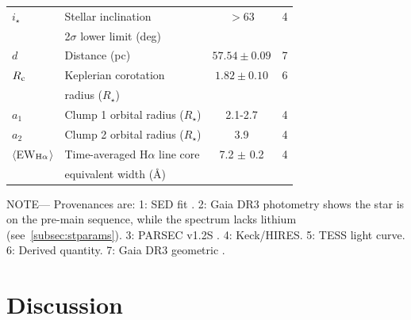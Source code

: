\documentclass{nature3}
\begin{document}
\begin{table}
\begin{tabular}{llcc}
%
$i_\star$\dotfill                       & Stellar inclination\dotfill                                    & 	$>$63           & 4 \\
                                        & \hspace{3pt}  2$\sigma$ lower limit (deg)	                     &                      \\
%
$d$\dotfill                             & Distance (pc)\dotfill                                          & $57.54 \pm 0.09$ & 7 \\
%
$R_{\rm c}$\dotfill		                  & Keplerian corotation\dotfill                                   & $1.82 \pm 0.10$  & 6 \\
                                        & \hspace{3pt} radius ($R_\star$)	                               &                      \\
%
$a_1$\dotfill                           & Clump 1 orbital radius ($R_\star$)\hspace{9pt}\dotfill         &  2.1-2.7         & 4 \\
$a_2$\dotfill                           & Clump 2 orbital radius ($R_\star$)\hspace{9pt}\dotfill         &  3.9             & 4 \\
%
$\langle$EW$_{\rm H\alpha}$$\rangle$    & Time-averaged H$\alpha$ line core                              &  7.2 $\pm$ 0.2   & 4 \\ 
                                        & \hspace{3pt} equivalent width (\AA)	                           &                      \\
\hline
\end{tabular}
\begin{flushleft}
\footnotesize{ \textsc{NOTE}---
Provenances are:
1: SED fit \cite{Bouma2024}.
2: Gaia DR3 photometry shows the star is on the pre-main sequence,
   while the spectrum lacks lithium (see~\ref{subsec:stparams}).
3: PARSEC v1.2S \cite{Chen2014}.
4: Keck/HIRES.
5: TESS light curve.
6: Derived quantity.
7: Gaia DR3 geometric \cite{GaiaDR3}.
}
\end{flushleft}
\vspace{-0.5cm}
\end{table}



\section{Discussion}
\end{document}
